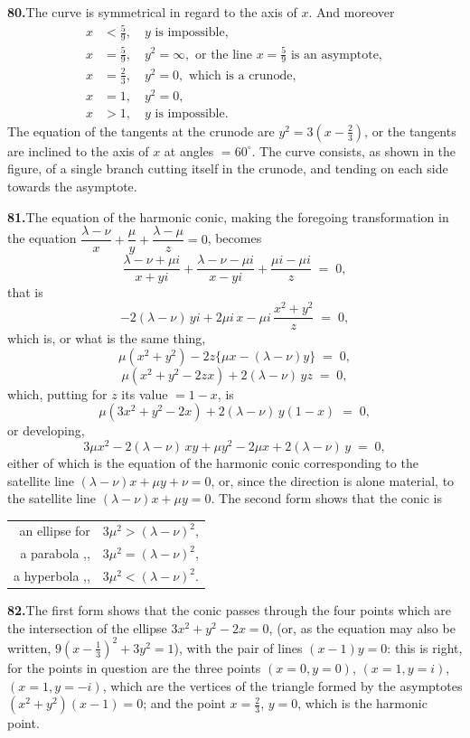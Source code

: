 \documentclass[11pt]{article}
\begin{document}
\medskip
\textbf{80.}\quad The curve is symmetrical in regard to the axis of $x$. And moreover
\begin{align*}
x &< \tfrac{5}{9},\quad y \text{ is impossible},\\
x &= \tfrac{5}{9},\quad y^{2} = \infty, \text{ or the line } x = \tfrac{5}{9} \text{ is an asymptote},\\
x &= \tfrac{2}{3},\quad y^{2} = 0, \text{ which is a crunode},\\
x &= 1,\quad y^{2} = 0,\\
x &> 1,\quad y \text{ is impossible}.
\end{align*}
The equation of the tangents at the crunode are $y^{2} = 3(x - \tfrac{2}{3})$, or the tangents are inclined to the axis of $x$ at angles $= 60^{\circ}$. The curve consists, as shown in the figure, of a single branch cutting itself in the crunode, and tending on each side towards the asymptote.

\medskip
\textbf{81.}\quad The equation of the harmonic conic, making the foregoing transformation in the equation $\dfrac{\lambda - \nu}{x} + \dfrac{\mu}{y} + \dfrac{\lambda - \mu}{z} = 0$, becomes
\[
\frac{\lambda - \nu + \mu i}{x + y i} + \frac{\lambda - \nu - \mu i}{x - y i} + \frac{\mu i - \mu i}{z} \;=\; 0,
\]
that is
\[
-2(\lambda - \nu)\,yi + 2\mu i\, x - \mu i\,\frac{x^{2}+y^{2}}{z} \;=\; 0,
\]
which is, or what is the same thing,
\[
\mu(x^{2}+y^{2}) - 2 z\bigl\{\mu x - (\lambda - \nu) y\bigr\} \;=\; 0,
\]
\[
\mu(x^{2}+y^{2} - 2 z x) + 2(\lambda - \nu)\, y z \;=\; 0,
\]
which, putting for $z$ its value $= 1 - x$, is
\[
\mu(3 x^{2} + y^{2} - 2 x) + 2(\lambda - \nu)\, y(1 - x) \;=\; 0,
\]
or developing,
\[
3 \mu x^{2} - 2(\lambda - \nu)\, x y + \mu y^{2} - 2 \mu x + 2(\lambda - \nu)\, y \;=\; 0,
\]
either of which is the equation of the harmonic conic corresponding to the satellite line $(\lambda - \nu) x + \mu y + \nu = 0$, or, since the direction is alone material, to the satellite line $(\lambda - \nu) x + \mu y = 0$. The second form shows that the conic is
\begin{center}\begin{tabular}{rl}
an ellipse for & $3\mu^{2} > (\lambda - \nu)^{2}$,\\
a parabola ,, & $3\mu^{2} = (\lambda - \nu)^{2}$,\\
a hyperbola ,, & $3\mu^{2} < (\lambda - \nu)^{2}$.
\end{tabular}\end{center}

\medskip
\textbf{82.}\quad The first form shows that the conic passes through the four points which are the intersection of the ellipse $3 x^{2} + y^{2} - 2 x = 0$, (or, as the equation may also be written, $9(x - \tfrac{1}{3})^{2} + 3 y^{2} = 1$), with the pair of lines $(x - 1) y = 0$: this is right, for the points in question are the three points $(x = 0, y = 0)$, $(x = 1, y = i)$, $(x = 1, y = -i)$, which are the vertices of the triangle formed by the asymptotes $(x^{2}+y^{2})(x - 1) = 0$; and the point $x = \tfrac{2}{3}$, $y = 0$, which is the harmonic point.
\end{document}
